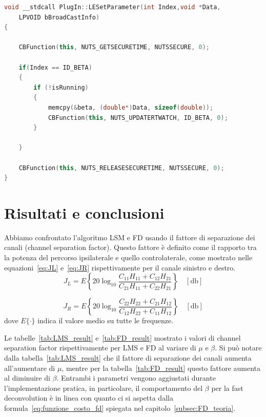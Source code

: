 \documentclass[12pt,a4paper,titlepage]{article}
\begin{document}
\begin{lstlisting}[language=cpp, label=code:set_rtwatch_fd, caption = Funzione \texttt{LESetParameter}, breaklines = false, captionpos = b]
void __stdcall PlugIn::LESetParameter(int Index,void *Data,
	LPVOID bBroadCastInfo)
{

	CBFunction(this, NUTS_GETSECURETIME, NUTSSECURE, 0);

	if(Index == ID_BETA)
	{
		if (!isRunning)
		{
			memcpy(&beta, (double*)Data, sizeof(double));
			CBFunction(this, NUTS_UPDATERTWATCH, ID_BETA, 0);
		}
		
	}

	CBFunction(this, NUTS_RELEASESECURETIME, NUTSSECURE, 0);
}
\end{lstlisting}
\clearpage

\section{Risultati e conclusioni}
\label{sec:risultati}
Abbiamo confrontato l'algoritmo LSM e FD usando il fattore di separazione dei canali (channel separation factor). Questo fattore è definito come il rapporto tra la potenza del percorso ipsilaterale e quello controlaterale, come mostrato nelle equazioni~\eqref{eq:JL} e~\eqref{eq:JR} rispettivamente per il canale sinistro e destro.
\begin{equation}\label{eq:JL}
J_L = E\left\{20\log_{10} \dfrac{C_{11}H_{11}+C_{12}H_{21}}{C_{21}H_{11}+C_{22}H_{21}}\right\} \quad [\si{\decibel}]
\end{equation}

\begin{equation}\label{eq:JR}
J_R = E\left\{20\log_{10} \dfrac{C_{22}H_{22}+C_{21}H_{12}}{C_{12}H_{22}+C_{11}H_{12}}\right\} \quad [\si{\decibel}]
\end{equation}
dove $E\{\cdot\}$ indica il valore medio su tutte le frequenze.

Le tabelle~\ref{tab:LMS_result} e~\ref{tab:FD_result} mostrato i valori di channel separation factor rispettivamente per LMS e FD al variare di $\mu$ e $\beta$. Si può notare dalla tabella~\ref{tab:LMS_result} che il fattore di separazione dei canali aumenta all'aumentare di $\mu$, mentre per la tabella~\ref{tab:FD_result} questo fattore aumenta al diminuire di $\beta$. Entrambi i parametri vengono aggiustati durante l'implementazione pratica, in particolare, il comportamento del $\beta$ per la fast deconvolution è in linea con quanto ci si aspetta dalla formula~\eqref{eq:funzione_costo_fd} spiegata nel capitolo~\ref{subsec:FD_teoria}.
\end{document}
